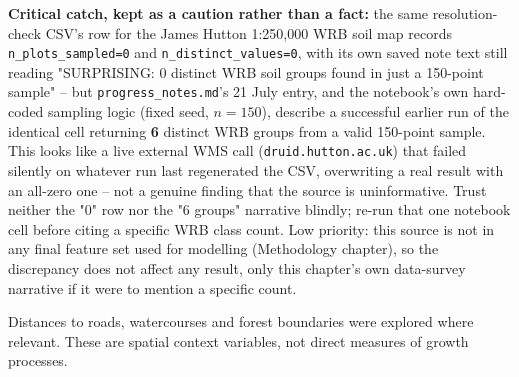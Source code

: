 \textbf{Critical catch, kept as a caution rather than a fact:} the same resolution-check CSV's row for the James Hutton 1:250,000 WRB soil map records \texttt{n\_plots\_sampled=0} and \texttt{n\_distinct\_values=0}, with its own saved note text still reading "SURPRISING: 0 distinct WRB soil groups found in just a 150-point sample" -- but \texttt{progress\_notes.md}'s 21 July entry, and the notebook's own hard-coded sampling logic (fixed seed, $n=150$), describe a successful earlier run of the identical cell returning \textbf{6} distinct WRB groups from a valid 150-point sample. This looks like a live external WMS call (\texttt{druid.hutton.ac.uk}) that failed silently on whatever run last regenerated the CSV, overwriting a real result with an all-zero one -- not a genuine finding that the source is uninformative. Trust neither the "0" row nor the "6 groups" narrative blindly; re-run that one notebook cell before citing a specific WRB class count. Low priority: this source is not in any final feature set used for modelling (Methodology chapter), so the discrepancy does not affect any result, only this chapter's own data-survey narrative if it were to mention a specific count.

Distances to roads, watercourses and forest boundaries were explored where relevant.
These are spatial context variables, not direct measures of growth processes.

